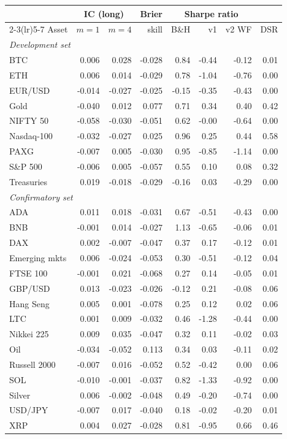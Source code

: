 \begin{tabular}{lrrrrrrr}
\toprule
& \multicolumn{2}{c}{IC (long)} & Brier & \multicolumn{3}{c}{Sharpe ratio} & \\
\cmidrule(lr){2-3}\cmidrule(lr){5-7}
Asset & $m{=}1$ & $m{=}4$ & skill & B\&H & v1 & v2 WF & DSR \\
\midrule
\multicolumn{8}{l}{\textit{Development set}}\\
BTC & 0.006 & 0.028 & -0.028 & 0.84 & -0.44 & -0.12 & 0.01\\
ETH & 0.006 & 0.014 & -0.029 & 0.78 & -1.04 & -0.76 & 0.00\\
EUR/USD & -0.014 & -0.027 & -0.025 & -0.15 & -0.35 & -0.43 & 0.00\\
Gold & -0.040 & 0.012 & 0.077 & 0.71 & 0.34 & 0.40 & 0.42\\
NIFTY 50 & -0.058 & -0.030 & -0.051 & 0.62 & -0.00 & -0.64 & 0.00\\
Nasdaq-100 & -0.032 & -0.027 & 0.025 & 0.96 & 0.25 & 0.44 & 0.58\\
PAXG & -0.007 & 0.005 & -0.030 & 0.95 & -0.85 & -1.14 & 0.00\\
S\&P 500 & -0.006 & 0.005 & -0.057 & 0.55 & 0.10 & 0.08 & 0.32\\
Treasuries & 0.019 & -0.018 & -0.029 & -0.16 & 0.03 & -0.29 & 0.00\\
\midrule
\multicolumn{8}{l}{\textit{Confirmatory set}}\\
ADA & 0.011 & 0.018 & -0.031 & 0.67 & -0.51 & -0.43 & 0.00\\
BNB & -0.001 & 0.014 & -0.027 & 1.13 & -0.65 & -0.06 & 0.01\\
DAX & 0.002 & -0.007 & -0.047 & 0.37 & 0.17 & -0.12 & 0.01\\
Emerging mkts & 0.006 & -0.024 & -0.053 & 0.30 & -0.51 & -0.12 & 0.04\\
FTSE 100 & -0.001 & 0.021 & -0.068 & 0.27 & 0.14 & -0.05 & 0.01\\
GBP/USD & 0.013 & -0.023 & -0.026 & -0.12 & 0.21 & -0.08 & 0.06\\
Hang Seng & 0.005 & 0.001 & -0.078 & 0.25 & 0.12 & 0.02 & 0.06\\
LTC & 0.001 & 0.009 & -0.032 & 0.46 & -1.28 & -0.44 & 0.00\\
Nikkei 225 & 0.009 & 0.035 & -0.047 & 0.32 & 0.11 & -0.02 & 0.03\\
Oil & -0.034 & -0.052 & 0.113 & 0.34 & 0.03 & -0.11 & 0.02\\
Russell 2000 & -0.007 & 0.016 & -0.052 & 0.52 & -0.42 & 0.00 & 0.06\\
SOL & -0.010 & -0.001 & -0.037 & 0.82 & -1.33 & -0.92 & 0.00\\
Silver & 0.006 & -0.002 & -0.048 & 0.49 & -0.20 & -0.74 & 0.00\\
USD/JPY & -0.007 & 0.017 & -0.040 & 0.18 & -0.02 & -0.20 & 0.01\\
XRP & 0.004 & 0.027 & -0.028 & 0.81 & -0.95 & 0.66 & 0.46\\
\bottomrule
\end{tabular}
